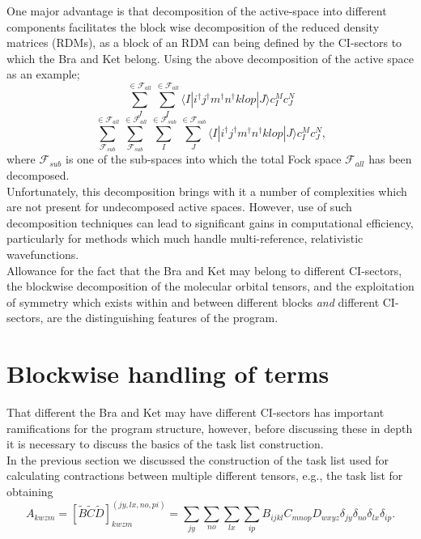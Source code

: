 \noindent One major advantage is that decomposition of the active-space
into different components facilitates the block wise decomposition of the reduced density matrices (RDMs),
as a block of an RDM can being defined by the CI-sectors to 
which the Bra and Ket belong. Using the above decomposition of the 
active space as an example;
\begin{equation*}
\sum_{J}^{ \in \mathcal{F}_{all} }
\sum_{I}^{ \in \mathcal{F}_{all} } \langle I | i^{\dagger}j^{\dagger}m^{\dagger}n^{\dagger}klop | J \rangle c^{M}_{I} c_{J}^{N}
\end{equation*}
\begin{equation*}
\sum^{ \in \mathcal{F}_{all} }_{ \mathcal{F}_{sub} }
\sum^{ \in \mathcal{F}_{all} }_{ \mathcal{F}_{sub} }
\sum^{ \in \mathcal{F}_{sub}}_{I}
\sum^{ \in \mathcal{F}_{sub}}_{J} \langle I | i^{\dagger}j^{\dagger}m^{\dagger}n^{\dagger}klop | J \rangle c^{M}_{I} c_{J}^{N},
\end{equation*}
\noindent where $\mathcal{F}_{sub}$ is one of the sub-spaces
into which the total Fock space $\mathcal{F}_{all}$ has been decomposed.\\

\noindent Unfortunately, this decomposition brings with it a number of
complexities which are not present for undecomposed active spaces. However, 
use of such decomposition techniques can lead to significant gains 
in computational efficiency, particularly for methods which much handle
multi-reference, relativistic wavefunctions.\\ 

\noindent Allowance for the fact that the Bra and Ket may belong to different CI-sectors,
the blockwise decomposition of the molecular orbital tensors, and the exploitation 
of symmetry which exists within and between different blocks \emph{and}  different CI-sectors,
are the distinguishing features of the program.

\section{ Blockwise handling of terms } 
\noindent That different the Bra and Ket may have different CI-sectors has
important ramifications for the program structure, however, before discussing
these in depth it is necessary to discuss the basics of the task list
construction.\\

\noindent In the previous section we discussed the construction of the task list 
used for calculating contractions between multiple different tensors, e.g., the 
task list for obtaining
\begin{equation}
A_{kwzm} = 
[\tilde{B}\tilde{C}\tilde{D}]^{(jy,lx,no,pi)}_{kwzm} = \sum_{jy}\sum_{no}\sum_{lx}\sum_{ip} B_{ijkl}C_{mnop}D_{wxyz} \delta_{jy} \delta_{no} \delta_{lx}\delta_{ip}.
\end{equation}

